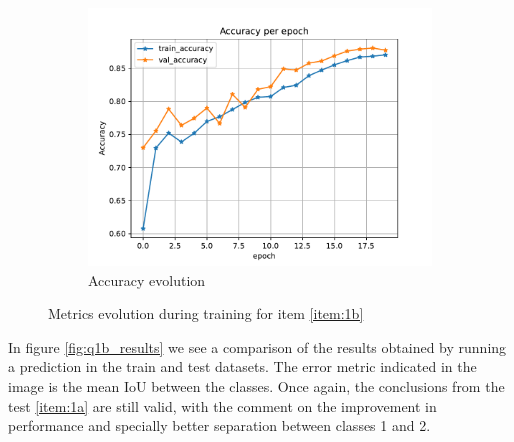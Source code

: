 \documentclass[10pt, a4paper]{article}
\begin{document}
\begin{figure}[htpb]
\begin{subfigure}[b]{0.32\textwidth}
      \centering
      \includegraphics[width=\textwidth]{images/Patch64_imagenet_acc.pdf}
      \caption{Accuracy evolution}
      \label{fig:q1b_acc}
  \end{subfigure}
  \caption{Metrics evolution during training for item \ref{item:1b}}
  \label{fig:q1b_metrics}
\end{figure}

In figure \ref{fig:q1b_results} we see a comparison of the results obtained by running a prediction in the train and test datasets. The error metric indicated
in the image is the mean IoU between the classes. Once again, the conclusions from the test \ref{item:1a} are still valid, with the comment on the improvement
in performance and specially better separation between classes 1 and 2.
\end{document}
